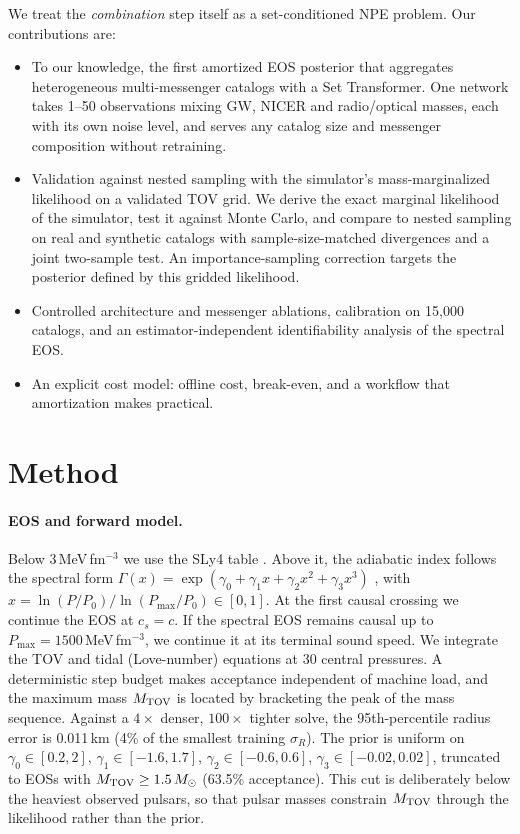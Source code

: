 \documentclass{article}
\newcommand{\Msun}{M_\odot}
\begin{document}
We treat the \emph{combination} step itself as a set-conditioned NPE problem. Our contributions are:
\begin{itemize}\setlength\itemsep{1pt}
\item To our knowledge, the first amortized EOS posterior that aggregates heterogeneous multi-messenger catalogs with a Set Transformer. One network takes 1--50 observations mixing GW, NICER and radio/optical masses, each with its own noise level, and serves any catalog size and messenger composition without retraining.
\item Validation against nested sampling with the simulator's mass-marginalized likelihood on a validated TOV grid. We derive the exact marginal likelihood of the simulator, test it against Monte Carlo, and compare to nested sampling on real and synthetic catalogs with sample-size-matched divergences and a joint two-sample test. An importance-sampling correction \citep{dax2023neural} targets the posterior defined by this gridded likelihood.
\item Controlled architecture and messenger ablations, calibration on 15,000 catalogs, and an estimator-independent identifiability analysis of the spectral EOS.
\item An explicit cost model: offline cost, break-even, and a workflow that amortization makes practical.
\end{itemize}

\section{Method}

\paragraph{EOS and forward model.} Below $3\,$MeV\,fm$^{-3}$ we use the SLy4 table \citep{douchin2001unified}. Above it, the adiabatic index follows the spectral form $\Gamma(x)=\exp(\gamma_0+\gamma_1x+\gamma_2x^2+\gamma_3x^3)$ \citep{lindblom2010spectral}, with $x=\ln(P/P_0)/\ln(P_{\max}/P_0)\in[0,1]$. At the first causal crossing we continue the EOS at $c_s=c$. If the spectral EOS remains causal up to $P_{\max}=1500\,$MeV\,fm$^{-3}$, we continue it at its terminal sound speed. We integrate the TOV and tidal (Love-number) equations \citep{hinderer2008tidal} at 30 central pressures. A deterministic step budget makes acceptance independent of machine load, and the maximum mass $M_{\rm TOV}$ is located by bracketing the peak of the mass sequence. Against a $4\times$ denser, $100\times$ tighter solve, the 95th-percentile radius error is 0.011\,km (4\% of the smallest training $\sigma_R$). The prior is uniform on $\gamma_0\in[0.2,2]$, $\gamma_1\in[-1.6,1.7]$, $\gamma_2\in[-0.6,0.6]$, $\gamma_3\in[-0.02,0.02]$, truncated to EOSs with $M_{\rm TOV}\ge1.5\,\Msun$ (63.5\% acceptance). This cut is deliberately below the heaviest observed pulsars, so that pulsar masses constrain $M_{\rm TOV}$ through the likelihood rather than the prior.
\end{document}

